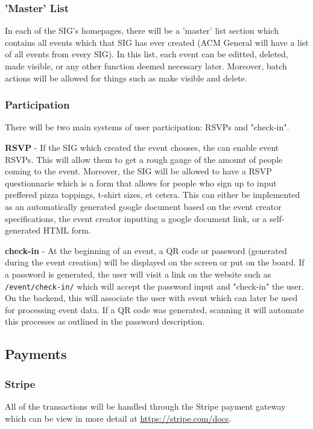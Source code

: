 \documentclass{article}
\begin{document}
\subsubsection{'Master' List}
In each of the SIG's homepages, there will be a 'master' list section which
contains all events which that SIG has ever created (ACM General will have a
list of all events from every SIG). In this list, each event can be editted,
deleted, made visible, or any other function deemed necessary later. Moreover,
batch actions will be allowed for things such as make visible and delete.

\subsubsection{Participation}
\label{sec:participation}
There will be two main systems of user participation: RSVPs and "check-in".

\textbf{RSVP} - If the SIG which created the event chooses, the can enable event
RSVPs. This will allow them to get a rough gauge of the amount of people coming
to the event. Moreover, the SIG will be allowed to have a RSVP questionnarie which
is a form that allows for people who sign up to input preffered pizza toppings, 
t-shirt sizes, et cetera. This can either be implemented as an automatically generated
google document based on the event creator specifications, the event creator
inputting a google document link, or a self-generated HTML form. 

\textbf{check-in} - At the beginning of an event, a QR code or password (generated
during the event creation) will be displayed on the screen or put on the board.
If a password is generated, the user will visit a link on the website such as
\texttt{/event/check-in/} which will accept the password input and "check-in"
the user. On the backend, this will associate the user with event which can
later be used for processing event data. If a QR code was generated, scanning it
will automate this processes as outlined in the password description.

\subsection{Payments}
\subsubsection{Stripe}
All of the transactions will be handled through the Stripe payment gateway which
can be view in more detail at \url{https://stripe.com/docs}.
\end{document}
